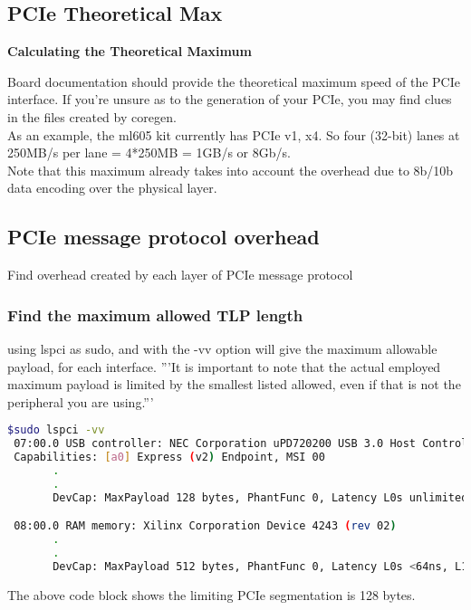 \subsection{PCIe Theoretical Max}
\textbf{Calculating the Theoretical Maximum}

Board documentation should provide the theoretical maximum speed of the PCIe interface.  If you're unsure as to the generation of your PCIe, you may find clues in the files created by coregen. \\

As an example, the ml605 kit currently has PCIe v1, x4.  So four (32-bit) lanes at 250MB/s per lane = 4*250MB = 1GB/s or 8Gb/s. \\

Note that this maximum already takes into account the overhead due to 8b/10b data encoding over the physical layer.\\

\subsection{PCIe message protocol overhead}
Find overhead created by each layer of PCIe message protocol


\subsubsection{Find the maximum allowed TLP length}
 using lspci as sudo, and with the -vv option will give the maximum allowable payload, for each interface.  '''It is important to note that the actual employed maximum payload is limited by the smallest listed allowed, even if that is not the peripheral you are using.'''

\begin{lstlisting}[language=bash]
$sudo lspci -vv
 07:00.0 USB controller: NEC Corporation uPD720200 USB 3.0 Host Controller (rev 04) (prog-if 30 [XHCI])
 Capabilities: [a0] Express (v2) Endpoint, MSI 00
       .
       .
       DevCap: MaxPayload 128 bytes, PhantFunc 0, Latency L0s unlimited, L1 unlimited

 08:00.0 RAM memory: Xilinx Corporation Device 4243 (rev 02)
       .
       .
       DevCap: MaxPayload 512 bytes, PhantFunc 0, Latency L0s <64ns, L1 unlimited
\end{lstlisting}



The above code block shows the limiting PCIe segmentation is 128 bytes.


